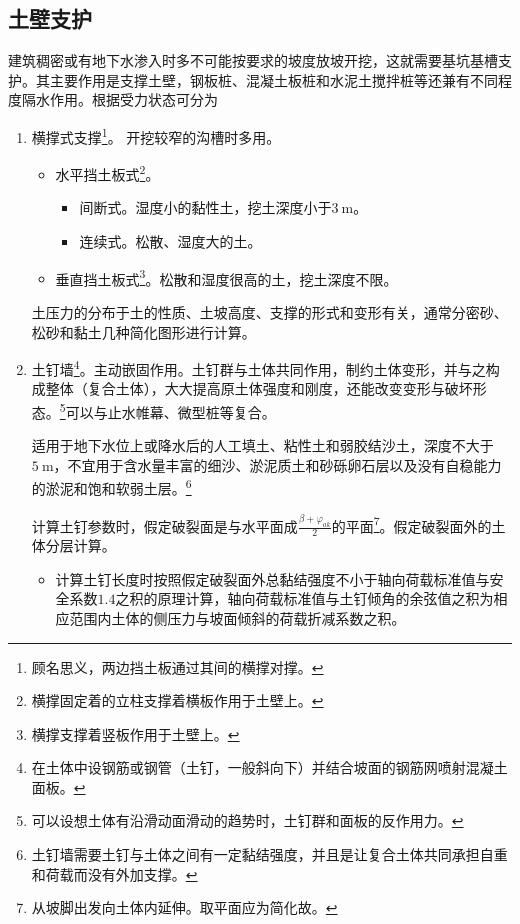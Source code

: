 \documentclass{book}
\begin{document}
\subsection{土壁支护}
\par 建筑稠密或有地下水渗入时多不可能按要求的坡度放坡开挖，这就需要基坑基槽支护。其主要作用是支撑土壁，钢板桩、混凝土板桩和水泥土搅拌桩等还兼有不同程度隔水作用。根据受力状态可分为
\begin{enumerate}
    \item 横撑式支撑\footnote{顾名思义，两边挡土板通过其间的横撑对撑。}。
          开挖较窄的沟槽时多用。
          \begin{itemize}
              \item 水平挡土板式\footnote{横撑固定着的立柱支撑着横板作用于土壁上。}。
                    \begin{itemize}
                        \item 间断式。湿度小的黏性土，挖土深度小于$\SI{3}{\m}$。
                        \item 连续式。松散、湿度大的土。
                    \end{itemize}
              \item 垂直挡土板式\footnote{横撑支撑着竖板作用于土壁上。}。松散和湿度很高的土，挖土深度不限。
          \end{itemize}
          土压力的分布于土的性质、土坡高度、支撑的形式和变形有关，通常分密砂、松砂和黏土几种简化图形进行计算。
    \item 土钉墙\footnote{在土体中设钢筋或钢管（土钉，一般斜向下）并结合坡面的钢筋网喷射混凝土面板。}。主动嵌固作用。土钉群与土体共同作用，制约土体变形，并与之构成整体（复合土体），大大提高原土体强度和刚度，还能改变变形与破坏形态。\footnote{可以设想土体有沿滑动面滑动的趋势时，土钉群和面板的反作用力。}可以与止水帷幕、微型桩等复合。
          \par 适用于地下水位上或降水后的人工填土、粘性土和弱胶结沙土，深度不大于$\SI{5}{\m}$，不宜用于含水量丰富的细沙、淤泥质土和砂砾卵石层以及没有自稳能力的淤泥和饱和软弱土层。\footnote{土钉墙需要土钉与土体之间有一定黏结强度，并且是让复合土体共同承担自重和荷载而没有外加支撑。}
          \par 计算土钉参数时，假定破裂面是与水平面成$\frac{\beta+\varphi_{ak}}{2}$的平面\footnote{从坡脚出发向土体内延伸。取平面应为简化故。}。假定破裂面外的土体分层计算。
          \begin{itemize}
              \item 计算土钉长度时按照假定破裂面外总黏结强度不小于轴向荷载标准值与安全系数$1.4$之积的原理计算，轴向荷载标准值与土钉倾角的余弦值之积为相应范围内土体的侧压力与坡面倾斜的荷载折减系数之积。

\end{itemize}
\end{enumerate}
\end{document}

